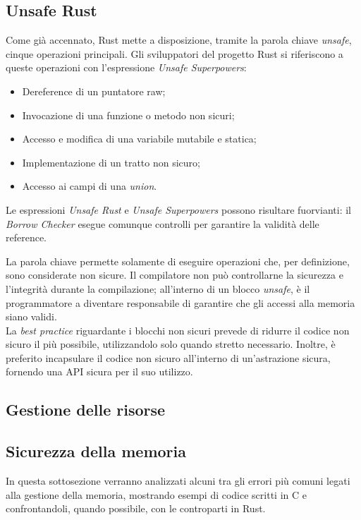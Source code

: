 \subsection*{Unsafe Rust}
Come già accennato, Rust mette a disposizione, tramite la parola chiave \textit{unsafe}, cinque operazioni principali. Gli sviluppatori
del progetto Rust si riferiscono a queste operazioni con l'espressione \textit{Unsafe Superpowers}:
\begin{itemize}
    \item Dereference di un puntatore raw;
    \item Invocazione di una funzione o metodo non sicuri;
    \item Accesso e modifica di una variabile mutabile e statica;
    \item Implementazione di un tratto non sicuro;
    \item Accesso ai campi di una \textit{union}.
\end{itemize}
Le espressioni \textit{Unsafe Rust} e \textit{Unsafe Superpowers} possono risultare fuorvianti: il \textit{Borrow Checker} esegue 
comunque controlli per garantire la validità delle reference. 

La parola chiave permette solamente di eseguire operazioni che, per definizione, sono considerate non sicure. 
Il compilatore non può controllarne la sicurezza e l'integrità durante la compilazione; all'interno di un blocco
 \textit{unsafe}, è il programmatore a diventare responsabile di garantire che gli accessi alla memoria
siano validi. \hfill
\vspace{12pt}\\
\noindent La \textit{best practice} riguardante i blocchi non sicuri prevede di ridurre il codice non sicuro il più possibile, utilizzandolo solo quando stretto necessario.
Inoltre, è preferito incapsulare il codice non sicuro all'interno di un'astrazione sicura, fornendo una API sicura per il suo utilizzo. \hfill
\subsection{Gestione delle risorse}
\subsection{Sicurezza della memoria}
In questa sottosezione verranno analizzati alcuni tra gli errori più comuni legati alla gestione della memoria,
mostrando esempi di codice scritti in C e confrontandoli, quando possibile, con le controparti in Rust.

